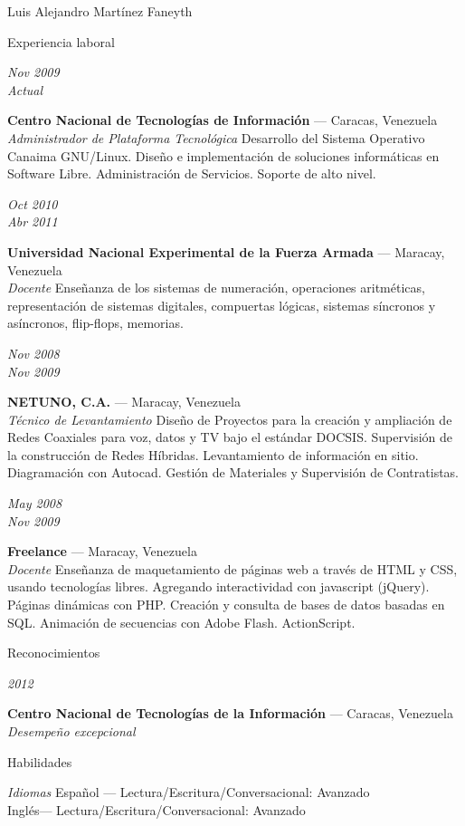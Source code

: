 \documentclass[letterpaper]{scrartcl}
\begin{document}
\begin{cv}{Luis Alejandro Mart\'inez Faneyth}
\begin{cvlist}{Experiencia laboral}
\item[{\parbox[t]{6em}{\textit{\large{Nov 2009\\Actual}}}}]{
	\parbox[t]{\linewidth}{
		\textbf{Centro Nacional de Tecnolog\'ias de Informaci\'on} --- Caracas, Venezuela\\
		\textit{Administrador de Plataforma Tecnol\'ogica}
		\footnotesize{Desarrollo del Sistema Operativo Canaima GNU/Linux. Dise\~no e implementaci\'on de soluciones inform\'aticas en Software Libre. Administración de Servicios. Soporte de alto nivel.}
	}
}
\item[{\parbox[t]{6em}{\textit{\large{Oct 2010\\Abr 2011}}}}]{
	\parbox[t]{\linewidth}{
		\textbf{Universidad Nacional Experimental de la Fuerza Armada} --- Maracay, Venezuela\\
		\textit{Docente}
		\footnotesize{Enseñanza de los sistemas de numeración, operaciones aritméticas, representación de sistemas digitales, compuertas lógicas, sistemas síncronos y asíncronos, flip-flops, memorias.}
	}
}
\item[{\parbox[t]{6em}{\textit{\large{Nov 2008\\Nov 2009}}}}]{
	\parbox[t]{\linewidth}{
		\textbf{NETUNO, C.A.} --- Maracay, Venezuela\\
		\textit{Técnico de Levantamiento}
		\footnotesize{Diseño de Proyectos para la creación y ampliación de Redes Coaxiales para voz, datos y TV bajo el estándar DOCSIS. Supervisión de la construcción de Redes Híbridas. Levantamiento de información en sitio. Diagramación con Autocad. Gestión de Materiales y Supervisión de Contratistas.}
	}
}
\item[{\parbox[t]{6em}{\textit{\large{May 2008\\Nov 2009}}}}]{
	\parbox[t]{\linewidth}{
		\textbf{Freelance} --- Maracay, Venezuela\\
		\textit{Docente}
		\footnotesize{Enseñanza de maquetamiento de páginas web a través de HTML y CSS, usando tecnologías libres. Agregando interactividad con javascript (jQuery). Páginas dinámicas con PHP. Creación y consulta de bases de datos basadas en SQL. Animación de secuencias con Adobe Flash. ActionScript.}
	}
}
\end{cvlist}

\begin{cvlist}{Reconocimientos}
\item[{\parbox[t]{6em}{\textit{\large{2012}}}}]{
	\parbox[t]{\linewidth}{
		\textbf{Centro Nacional de Tecnolog\'ias de la Informaci\'on} --- Caracas, Venezuela\\
		\textit{Desempeño excepcional}
	}
}
\end{cvlist}

\begin{cvlist}{Habilidades}
\item[\textit{\large{Idiomas}}]{
	Espa\~nol --- Lectura/Escritura/Conversacional: Avanzado\\
	Ingl\'es--- Lectura/Escritura/Conversacional: Avanzado
}
\end{cvlist}

\end{cv}
\end{document}
